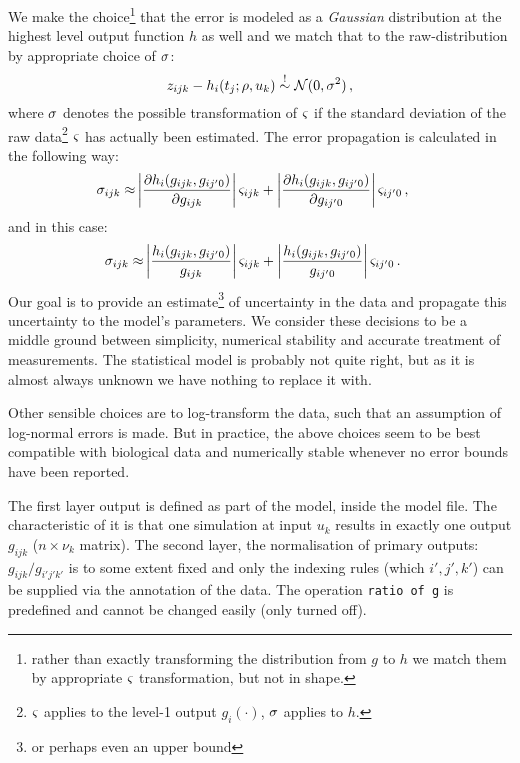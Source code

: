 \documentclass[utf8,english,DIV=12,12pt]{scrartcl}
\newcommand{\stdv}[1]{\ensuremath{\ifthenelse{\equal{#1}{g}}{\varsigma}{\sigma}}}
\newcommand{\data}[1]{\ensuremath{\ifthenelse{\equal{#1}{g}}{y}{z}}}
\begin{document}
We make the choice\footnote{rather than exactly transforming the
  distribution from $g$ to $h$ we match them by appropriate $\stdv{g}$
  transformation, but not in shape.} that the error is modeled as a
\emph{Gaussian} distribution at the highest level output function $h$
as well and we match that to the raw-distribution by appropriate
choice of $\stdv{h}$:
\begin{equation}
  \label{eq:error}
  \data{h}_{ijk} - h_i(t_j;\rho,u_k)\overset{!}{\sim}\mathcal{N}(0,\stdv{h}^2)\,,
\end{equation}
where $\stdv{h}$ denotes the possible transformation of $\stdv{g}$
if the standard deviation of the raw data\footnote{$\stdv{g}$ applies
  to the level-1 output $g_i(\cdot)$, $\stdv{h}$ applies to $h$.} $\stdv{g}$ has
  actually been estimated. The error propagation is calculated in the
  following way:
\begin{align}
  \label{eq:stdv_partial}
  \stdv{h}_{ijk}\approx&\left|\frac{\partial
      h_i(g_{ijk},g_{ij'0})}{\partial
      g_{ijk}}\right|\stdv{g}_{ijk} +
  \left|\frac{\partial h_i(g_{ijk},g_{ij'0})}{\partial
      g_{ij'0}}\right|\stdv{g}_{ij'0}\,,
\end{align}
and in this case:
\begin{align}
  \label{eq:stdv_ratio}
    \stdv{h}_{ijk}\approx&\left|\frac{h_i(g_{ijk},g_{ij'0})}{g_{ijk}}\right|\stdv{g}_{ijk} + \left|\frac{h_i(g_{ijk},g_{ij'0})}{g_{ij'0}}\right|\stdv{g}_{ij'0}\,.
\end{align}
Our goal is to provide an estimate\footnote{or perhaps even an upper
  bound} of uncertainty in the data and propagate this uncertainty to
the model's parameters. We consider these decisions to be a middle
ground between simplicity, numerical stability and accurate treatment
of measurements. The statistical model is probably not quite right,
but as it is almost always unknown we have nothing to replace it with.

Other sensible choices are to log-transform the data, such that an
assumption of log-normal errors is made. But in practice, the above
choices seem to be best compatible with biological data and
numerically stable whenever no error bounds have been reported.

The first layer output is defined as part of the model, inside the
model file. The characteristic of it is that one simulation at input
$u_k$ results in exactly one output $g_{ijk}$ ($n×\nu_k$ matrix). The
second layer, the normalisation of primary outputs:
$g_{ijk}/g_{i'j'k'}$ is to some extent fixed and only the indexing
rules (which $i',j',k'$) can be supplied via the annotation of the
data. The operation \texttt{ratio of g} is predefined and cannot be
changed easily (only turned off).
\end{document}
